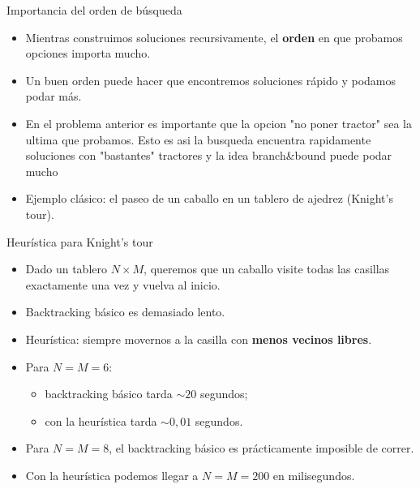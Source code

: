 \documentclass[aspectratio=169]{beamer}
\begin{document}
\begin{frame}{Importancia del orden de búsqueda}
  \begin{itemize}
    \item Mientras construimos soluciones recursivamente, el \textbf{orden} en que probamos opciones importa mucho.
    \item Un buen orden puede hacer que encontremos soluciones rápido y podamos podar más.
    \item En el problema anterior es importante que la opcion "no poner tractor" sea la ultima que probamos. Esto es asi la busqueda encuentra rapidamente soluciones con "bastantes" tractores y la idea branch\&bound puede podar mucho
    \item Ejemplo clásico: el paseo de un caballo en un tablero de ajedrez (Knight's tour).
  \end{itemize}
\end{frame}

\begin{frame}[fragile]{Heurística para Knight's tour}
  \begin{itemize}
    \item Dado un tablero \(N \times M\), queremos que un caballo visite todas las casillas exactamente una vez y vuelva al inicio.
    \item Backtracking básico es demasiado lento.
    \item Heurística: siempre movernos a la casilla con \textbf{menos vecinos libres}.
  \end{itemize}
  \begin{itemize}
    \item Para \(N = M = 6\):
      \begin{itemize}
        \item backtracking básico tarda \(\sim 20\) segundos;
        \item con la heurística tarda \(\sim 0{,}01\) segundos.
      \end{itemize}
    \item Para \(N = M = 8\), el backtracking básico es prácticamente imposible de correr.
    \item Con la heurística podemos llegar a \(N = M = 200\) en milisegundos.
  \end{itemize}
\end{frame}
\end{document}
